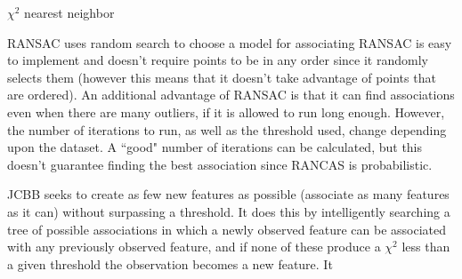 \documentclass[12pt]{article}
\begin{document}
	$\chi^2$ nearest neighbor %

	RANSAC uses random search to choose a model for associating
RANSAC is easy to implement and doesn't require points to be in any order since
it randomly selects them (however this means that it doesn't take advantage of points
that are ordered).  An additional advantage of RANSAC is that it can find associations
even when there are many outliers, if it is allowed to run long enough.  However, the
number of iterations to run, as well as the threshold used, change depending upon the
dataset.  A ``good" number of iterations can be calculated, but this doesn't guarantee
finding the best association since RANCAS is probabilistic. %

	JCBB seeks to create as few new features as possible (associate as many features
as it can) without surpassing a threshold.  It does this by intelligently searching a tree of
possible associations in which a newly observed feature can be associated with any
previously observed feature, and if none of these produce a $\chi^2$ less than a given
threshold the observation becomes a new feature.  It


\end{document}

